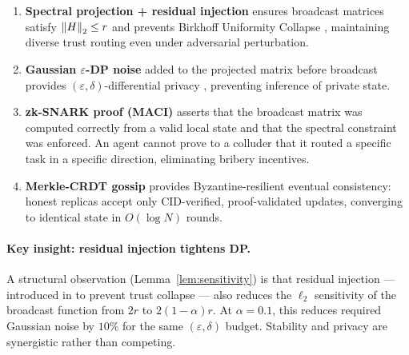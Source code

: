 \begin{enumerate}
  \item \textbf{Spectral projection + residual injection} ensures broadcast matrices
    satisfy $\left\|H\right\|_2 \leq r$ and prevents Birkhoff Uniformity Collapse
    \cite{mcfs_iclr2027}, maintaining diverse trust routing even under adversarial
    perturbation.

  \item \textbf{Gaussian $\varepsilon$-DP noise} added to the projected matrix before
    broadcast provides $({\varepsilon}, \delta)$-differential privacy
    \cite{dwork2014algorithmic}, preventing inference of private state.

  \item \textbf{zk-SNARK proof (MACI)} \cite{maci_spec} asserts that the broadcast matrix
    was computed correctly from a valid local state and that the spectral constraint was
    enforced.  An agent cannot prove to a colluder that it routed a specific task in a
    specific direction, eliminating bribery incentives.

  \item \textbf{Merkle-CRDT gossip} \cite{kleppmann2022crdt} provides Byzantine-resilient
    eventual consistency: honest replicas accept only CID-verified, proof-validated updates,
    converging to identical state in $O(\log N)$ rounds.
\end{enumerate}

\paragraph{Key insight: residual injection tightens DP.}
A structural observation (Lemma~\ref{lem:sensitivity}) is that residual injection —
introduced in \cite{mcfs_iclr2027} to prevent trust collapse — also reduces the
$\ell_2$ sensitivity of the broadcast function from $2r$ to $2(1-\alpha)r$.  At
$\alpha = 0.1$, this reduces required Gaussian noise by $10\%$ for the same
$(\varepsilon, \delta)$ budget.  Stability and privacy are synergistic rather than
competing.

